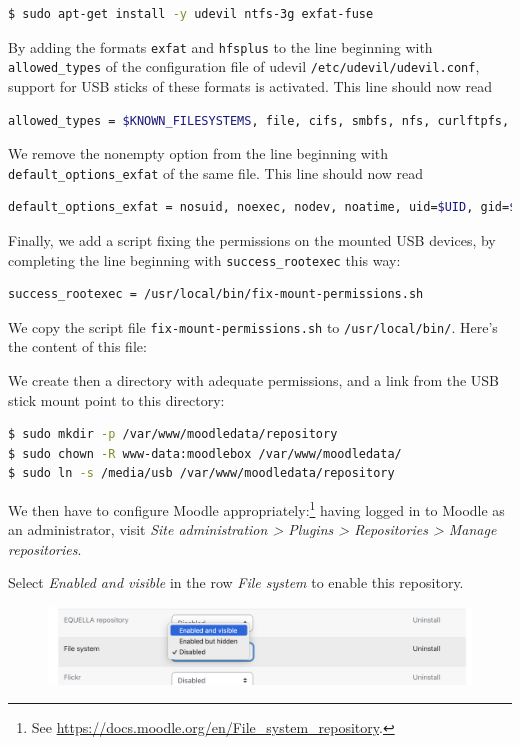 \documentclass[12pt]{article}
\begin{document}
\begin{lstlisting}[language=bash]
$ sudo apt-get install -y udevil ntfs-3g exfat-fuse
\end{lstlisting}
By adding the formats \lstinline{exfat} and \lstinline{hfsplus} to the line beginning with \lstinline{allowed_types} of the configuration file of udevil \lstinline{/etc/udevil/udevil.conf}, support for USB sticks of these formats is activated.
This line should now read
\begin{lstlisting}[language=bash]
allowed_types = $KNOWN_FILESYSTEMS, file, cifs, smbfs, nfs, curlftpfs, ftpfs, sshfs, davfs, tmpfs, ramfs, exfat, hfsplus
\end{lstlisting}
We remove the nonempty option from the line beginning with \lstinline{default_options_exfat} of the same file.
This line should now read
\begin{lstlisting}[language=bash]
default_options_exfat = nosuid, noexec, nodev, noatime, uid=$UID, gid=$GID, iocharset=utf8
\end{lstlisting}
Finally, we add a script fixing the permissions on the mounted USB devices, by completing the line beginning with \lstinline{success_rootexec} this way:
\begin{lstlisting}[language=bash]
success_rootexec = /usr/local/bin/fix-mount-permissions.sh
\end{lstlisting}
We copy the script file \lstinline{fix-mount-permissions.sh} to \lstinline{/usr/local/bin/}.
Here's the content of this file:



We create then a directory with adequate permissions, and a link from the USB stick mount point to this directory:
\begin{lstlisting}[language=bash]
$ sudo mkdir -p /var/www/moodledata/repository
$ sudo chown -R www-data:moodlebox /var/www/moodledata/
$ sudo ln -s /media/usb /var/www/moodledata/repository
\end{lstlisting}

We then have to configure Moodle appropriately:\footnote{See \url{https://docs.moodle.org/en/File_system_repository}.}
having logged in to Moodle as an administrator, visit \emph{Site administration > Plugins > Repositories > Manage repositories}.

Select \emph{Enabled and visible} in the row \emph{File system} to enable this repository.
\begin{figure}[!ht]
\begin{minipage}[b]{\linewidth}\centering
\includegraphics[width=13cm]{repo-filesystem-usb-1.png}
\end{minipage}
\end{figure}
\end{document}
